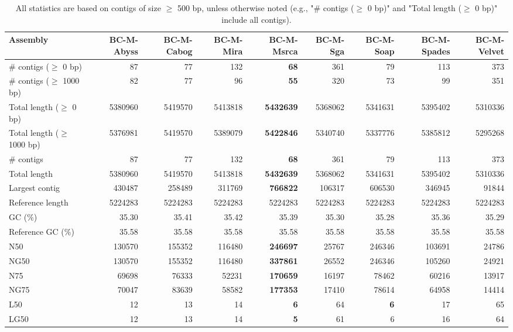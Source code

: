 \documentclass[12pt,a4paper]{article}
\begin{document}
\begin{table}[ht]
\begin{center}
\caption{All statistics are based on contigs of size $\geq$ 500 bp, unless otherwise noted (e.g., "\# contigs ($\geq$ 0 bp)" and "Total length ($\geq$ 0 bp)" include all contigs).}
\begin{tabular}{|l*{8}{|r}|}
\hline
Assembly & BC-M-Abyss & BC-M-Cabog & BC-M-Mira & BC-M-Msrca & BC-M-Sga & BC-M-Soap & BC-M-Spades & BC-M-Velvet \\ \hline
\# contigs ($\geq$ 0 bp) & 87 & 77 & 132 & {\bf 68} & 361 & 79 & 113 & 373 \\ \hline
\# contigs ($\geq$ 1000 bp) & 82 & 77 & 96 & {\bf 55} & 320 & 73 & 99 & 351 \\ \hline
Total length ($\geq$ 0 bp) & 5380960 & 5419570 & 5413818 & {\bf 5432639} & 5368062 & 5341631 & 5395402 & 5310336 \\ \hline
Total length ($\geq$ 1000 bp) & 5376981 & 5419570 & 5389079 & {\bf 5422846} & 5340740 & 5337776 & 5385812 & 5295268 \\ \hline
\# contigs & 87 & 77 & 132 & {\bf 68} & 361 & 79 & 113 & 373 \\ \hline
Total length & 5380960 & 5419570 & 5413818 & {\bf 5432639} & 5368062 & 5341631 & 5395402 & 5310336 \\ \hline
Largest contig & 430487 & 258489 & 311769 & {\bf 766822} & 106317 & 606530 & 346945 & 91844 \\ \hline
Reference length & 5224283 & 5224283 & 5224283 & 5224283 & 5224283 & 5224283 & 5224283 & 5224283 \\ \hline
GC (\%) & 35.30 & 35.41 & 35.42 & 35.39 & 35.30 & 35.28 & 35.36 & 35.29 \\ \hline
Reference GC (\%) & 35.58 & 35.58 & 35.58 & 35.58 & 35.58 & 35.58 & 35.58 & 35.58 \\ \hline
N50 & 130570 & 155352 & 116480 & {\bf 246697} & 25767 & 246346 & 103691 & 24786 \\ \hline
NG50 & 130570 & 155352 & 116480 & {\bf 337861} & 26552 & 246346 & 105260 & 24921 \\ \hline
N75 & 69698 & 76333 & 52231 & {\bf 170659} & 16197 & 78462 & 60216 & 13917 \\ \hline
NG75 & 70047 & 83639 & 58582 & {\bf 177353} & 17410 & 78614 & 64958 & 14414 \\ \hline
L50 & 12 & 13 & 14 & {\bf 6} & 64 & {\bf 6} & 17 & 65 \\ \hline
LG50 & 12 & 13 & 14 & {\bf 5} & 61 & 6 & 16 & 64 \\ \hline

\end{tabular}
\end{center}
\end{table}
\end{document}
